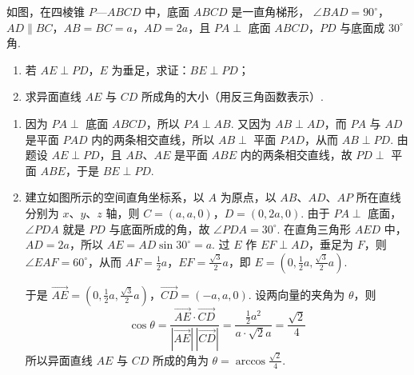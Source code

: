 \begin{problem}
如图，在四棱锥 \(P\)—\(ABCD\) 中，底面 \(ABCD\) 是一直角梯形， \(\angle BAD = 90^{\circ} \)，\(AD \parallel BC\)，\(AB = BC = a\)，\(AD = 2a\)，且 \(PA \perp \) 底面 \(ABCD\)，\(PD\) 与底面成 \(30^{\circ} \) 角.

\begin{enumerate}
\item 若 \(AE \perp PD\)，\(E\) 为垂足，求证：\(BE \perp PD\)；
\item 求异面直线 \(AE\) 与 \(CD\) 所成角的大小（用反三角函数表示）.
\end{enumerate}

\end{problem}

\begin{solution}
\begin{enumerate}
\item 因为 \(PA\perp\) 底面 \(ABCD\)，所以 \(PA\perp AB\). 又因为 \(AB\perp AD\)，而 \(PA\) 与 \(AD\) 是平面 \(PAD\) 内的两条相交直线，所以 \(AB\perp\) 平面 \(PAD\)，从而 \(AB\perp PD\). 由题设 \(AE\perp PD\)，且 \(AB\)、\(AE\) 是平面 \(ABE\) 内的两条相交直线，故 \(PD\perp\) 平面 \(ABE\)，于是 \(BE\perp PD\).

\item 建立如图所示的空间直角坐标系，以 \(A\) 为原点，以 \(AB\)、\(AD\)、\(AP\) 所在直线分别为 \(x\)、\(y\)、\(z\) 轴，则 \(C=(a,a,0)\)，\(D=(0,2a,0)\). 由于 \(PA\perp\) 底面，\(\angle PDA\) 就是 \(PD\) 与底面所成的角，故 \(\angle PDA=30^{\circ}\). 在直角三角形 \(AED\) 中，\(AD=2a\)，所以 \(AE=AD\sin30^{\circ}=a\). 过 \(E\) 作 \(EF\perp AD\)，垂足为 \(F\)，则 \(\angle EAF=60^{\circ}\)，从而 \(AF=\frac12a\)，\(EF=\frac{\sqrt3}{2}a\)，即 \(E=\left(0,\frac12a,\frac{\sqrt3}{2}a\right)\).

于是 \(\overrightarrow{AE}=\left(0,\frac12a,\frac{\sqrt3}{2}a\right)\)，\(\overrightarrow{CD}=(-a,a,0)\). 设两向量的夹角为 \(\theta\)，则
\[
\cos\theta=\frac{\overrightarrow{AE}\cdot\overrightarrow{CD}}{|\overrightarrow{AE}|\,|\overrightarrow{CD}|}=\frac{\frac12a^2}{a\cdot\sqrt2a}=\frac{\sqrt2}{4}
\]
所以异面直线 \(AE\) 与 \(CD\) 所成的角为 \(\theta=\arccos\frac{\sqrt2}{4}\).
\end{enumerate}
\end{solution}

